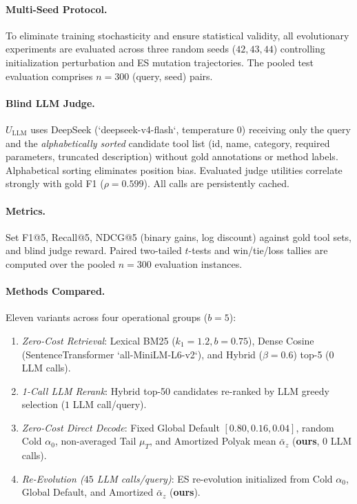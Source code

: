 \paragraph{Multi-Seed Protocol.}
To eliminate training stochasticity and ensure statistical validity, all evolutionary experiments are evaluated across three random seeds ($42, 43, 44$) controlling initialization perturbation and ES mutation trajectories. The pooled test evaluation comprises $n = 300$ (query, seed) pairs.

\paragraph{Blind LLM Judge.}
$U_{\mathrm{LLM}}$ uses DeepSeek (`deepseek-v4-flash`, temperature $0$) receiving only the query and the \emph{alphabetically sorted} candidate tool list (id, name, category, required parameters, truncated description) without gold annotations or method labels. Alphabetical sorting eliminates position bias. Evaluated judge utilities correlate strongly with gold F1 ($\rho = 0.599$). All calls are persistently cached.

\paragraph{Metrics.}
Set F1@5, Recall@5, NDCG@5 (binary gains, log discount) against gold tool sets, and blind judge reward. Paired two-tailed $t$-tests and win/tie/loss tallies are computed over the pooled $n{=}300$ evaluation instances.

\paragraph{Methods Compared.}
Eleven variants across four operational groups ($b{=}5$):
\begin{enumerate}
    \item \emph{Zero-Cost Retrieval}: Lexical BM25 ($k_1=1.2, b=0.75$), Dense Cosine (SentenceTransformer `all-MiniLM-L6-v2`), and Hybrid ($\beta=0.6$) top-5 ($0$ LLM calls).
    \item \emph{1-Call LLM Rerank}: Hybrid top-50 candidates re-ranked by LLM greedy selection ($1$ LLM call/query).
    \item \emph{Zero-Cost Direct Decode}: Fixed Global Default $[0.80, 0.16, 0.04]$, random Cold $\alpha_0$, non-averaged Tail $\mu_T$, and Amortized Polyak mean $\bar\alpha_z$ (\textbf{ours}, $0$ LLM calls).
    \item \emph{Re-Evolution ($45$ LLM calls/query)}: ES re-evolution initialized from Cold $\alpha_0$, Global Default, and Amortized $\bar\alpha_z$ (\textbf{ours}).
\end{enumerate}

